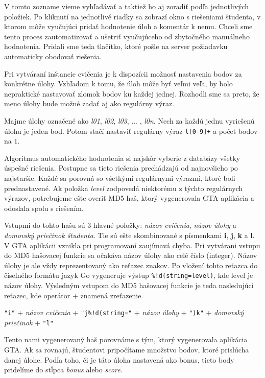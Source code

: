 V tomto zozname vieme vyhľadávať a taktiež ho aj zoradiť podľa jednotlivých položiek.
Po kliknutí na jednotlivé riadky sa zobrazí okno s riešeniami študenta, v ktorom môže vyučujúci pridať hodnotenie úloh a komentár k nemu. Chceli sme tento proces
zautomatizovať a ušetriť vyučujúceho od zbytočného manuálneho hodnotenia. Pridali sme
teda tlačítko, ktoré pošle na server požiadavku automaticky obodovať riešenia.

Pri vytváraní inštancie cvičenia je k dispozícii možnosť nastavenia bodov za konkrétne
úlohy. Vzhľadom k tomu, že úloh môže byť veľmi veľa, by bolo nepraktické nastavovať
zlomok bodov ku každej jednej. Rozhodli sme sa preto, že meno úlohy bude možné zadať
aj ako regulárny výraz.
\begin{prikl}
	Majme úlohy označené ako \textit{l01}, \textit{l02}, \textit{l03}, ... ,
	\textit{l0n}. Nech za každú jednu vyriešenú úlohu je jeden bod. Potom stačí
	nastaviť regulárny výraz \verb'l[0-9]+' a počet bodov na $1$.
\end{prikl}

Algoritmus automatického hodnotenia si najskôr vyberie z databázy všetky úspešné
riešenia. Postupne sa tieto riešenia prechádzajú od najnovšieho po najstaršie.
Každé sa porovná so všetkými regulárnymi výrazmi, ktoré boli prednastavené.
Ak položka \textit{level} zodpovedá niektorému z týchto regulárnych výrazov,
potrebujeme ešte overiť MD5 haš, ktorý vygenerovala GTA aplikácia a odoslala spolu
s riešením.

Vstupmi do tohto hašu sú 3 hlavné položky: \textit{názov cvičenia},
\textit{názov úlohy} a \textit{domovský priečinok študenta}. Tie sú ešte skombinované
s písmenkami \textbf{i}, \textbf{j}, \textbf{k} a \textbf{l}. V GTA aplikácii vznikla
pri programovaní zaujímavá chyba. Pri vytvárani vstupu do MD5 hašovacej funkcie
sa očakáva názov úlohy ako celé číslo (integer). Názov úlohy je ale vždy reprezentovaný
ako reťazec znakov. Po vložení tohto reťazca do číselného formátu jazyk Go vygeneruje
výstup \verb'%!d(string=level)',
kde level je názov úlohy.
Výsledným vstupom do MD5 hašovacej funkcie je teda nasledujúci reťazec, kde operátor
+ znamená zreťazenie.

\begin{center}
	\verb'"i"' + \textit{názov cvičenia} + \verb'"j%!d(string="' +
	\textit{názov úlohy} + \verb'")k"' + \textit{domovský priečinok} + \verb'"l"'
\end{center}

Tento nami vygenerovaný haš porovnáme s tým, ktorý vygenerovala aplikácia GTA.
Ak sa rovnajú, študentovi pripočítame množstvo bodov, ktoré prislúcha
danej úlohe. Podľa toho, či je táto úloha nastavená ako bonus, tieto body pridelíme
do stĺpca \textit{bonus} alebo \textit{score}.

